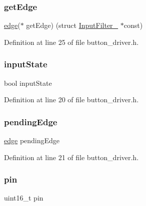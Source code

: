 \subsubsection{\texorpdfstring{get\+Edge}{getEdge}}
{\footnotesize\ttfamily \mbox{\hyperlink{button_8h_a4ef43ff5c6d42dacbc8ffd9c8cfdc189}{edge}}($\ast$ get\+Edge) (struct \mbox{\hyperlink{struct_input_filter__}{Input\+Filter\+\_\+}} $\ast$const)}



Definition at line 25 of file button\+\_\+driver.\+h.

\mbox{\label{struct_input_filter___a2e42fdbabb33aea9674a2f8f378ccd64}} 
\subsubsection{\texorpdfstring{input\+State}{inputState}}
{\footnotesize\ttfamily bool input\+State}



Definition at line 20 of file button\+\_\+driver.\+h.

\mbox{\label{struct_input_filter___a54118ea5021c85ed6693f0c268532b24}} 
\subsubsection{\texorpdfstring{pending\+Edge}{pendingEdge}}
{\footnotesize\ttfamily \mbox{\hyperlink{button_8h_a4ef43ff5c6d42dacbc8ffd9c8cfdc189}{edge}} pending\+Edge}



Definition at line 21 of file button\+\_\+driver.\+h.

\mbox{\label{struct_input_filter___a4144813adfa4dfe7e7cbeea17d1b06eb}} 
\subsubsection{\texorpdfstring{pin}{pin}}
{\footnotesize\ttfamily uint16\+\_\+t pin}



